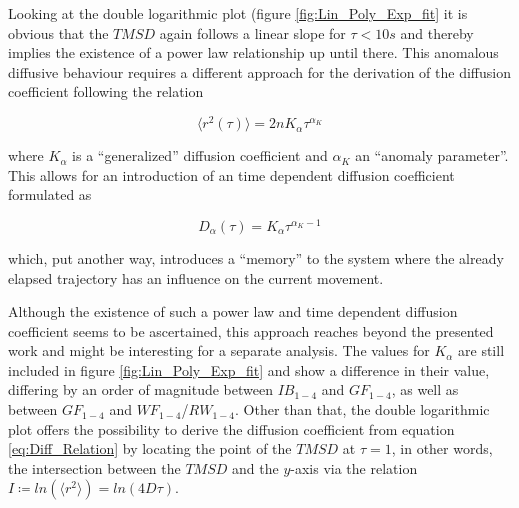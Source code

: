 Looking at the double logarithmic plot (figure \ref{fig:Lin_Poly_Exp_fit} it is obvious that the $TMSD$ again follows a linear slope for $\tau < 10s$ and thereby implies the existence of a power law relationship up until there. This anomalous diffusive behaviour requires a different approach for the derivation of the diffusion coefficient following the relation

\begin{equation}
    \label{eq:Diff_Relation_anomalous}
    \langle r^{2}(\tau) \rangle = 2n K_{\alpha} \tau^{\alpha_{K}}
\end{equation}

where $K_{\alpha}$ is a ``generalized'' diffusion coefficient and $\alpha_{K}$ an ``anomaly parameter''. This allows for an introduction of an time dependent diffusion coefficient \cite{Metzler2000} formulated as

\begin{equation}
    \label{eq:Time_Dep_Diff_Coeff}
    D_{\alpha}(\tau) = K_{\alpha} \tau^{\alpha_{K}-1}
\end{equation}

which, put another way, introduces a ``memory'' to the system where the already elapsed trajectory has an influence on the current movement.

Although the existence of such a power law and time dependent diffusion coefficient seems to be ascertained, this approach reaches beyond the presented work and might be interesting for a separate analysis. The values for $K_{\alpha}$ are still included in figure \ref{fig:Lin_Poly_Exp_fit} and show a difference in their value, differing by an order of magnitude between $IB_{1-4}$ and $GF_{1-4}$, as well as between $GF_{1-4}$ and $WF_{1-4}$/$RW_{1-4}$. Other than that, the double logarithmic plot offers the possibility to derive the diffusion coefficient from equation \ref{eq:Diff_Relation} by locating the point of the $TMSD$ at $\tau=1$, in other words, the intersection between the $TMSD$ and the $y$-axis via the relation $I \coloneqq ln(\langle r^{2} \rangle) = ln(4D\tau)$.


